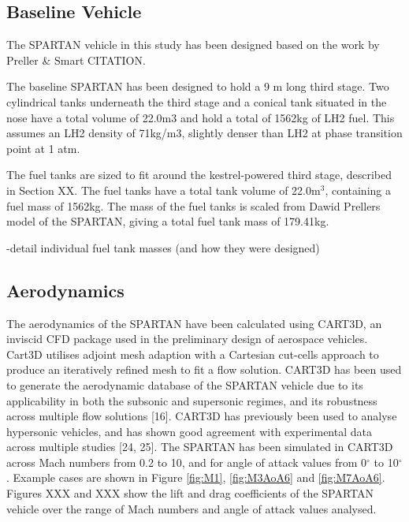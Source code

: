 		\subsection{Baseline Vehicle}
		The SPARTAN vehicle in this study has been designed based on the work by Preller \& Smart CITATION. 
		
		The baseline SPARTAN has been designed to hold a 9 m long third stage.  Two cylindrical tanks underneath the third stage and a conical tank situated in the nose have a total volume of 22.0m3 and hold a total of 1562kg of LH2 fuel. This assumes an LH2 density of 71kg/m3, slightly denser than LH2 at phase transition point at 1 atm.
		
		
		
		The fuel tanks are sized to fit around the kestrel-powered third stage, described in Section XX. 
The fuel tanks have a total tank volume of 22.0m$^3$, containing a fuel mass of 1562kg.
The mass of the fuel tanks is scaled from Dawid Prellers model of the SPARTAN, giving a total fuel tank mass of 179.41kg.
		
		-detail individual fuel tank masses (and how they were designed)

		
		
		\subsection{Aerodynamics}
		
		The aerodynamics of the SPARTAN have been calculated using CART3D, an inviscid CFD package used in the preliminary design of aerospace vehicles. Cart3D utilises adjoint mesh adaption with a Cartesian cut-cells approach to produce an iteratively refined mesh to fit a flow solution. CART3D has
		been used to generate the aerodynamic database of the SPARTAN vehicle due to its applicability in both the subsonic
		and supersonic regimes, and its robustness across multiple flow solutions [16]. CART3D has previously been used to
		analyse hypersonic vehicles, and has shown good agreement with experimental data across multiple studies [24, 25].
		The SPARTAN has been simulated in CART3D across Mach numbers from 0.2 to 10, and for angle of attack values from
		0$^\circ$ to 10$^\circ$. Example cases are shown in Figure \ref{fig:M1}, \ref{fig:M3AoA6} and \ref{fig:M7AoA6}. Figures XXX and XXX show the lift and drag
		coefficients of the SPARTAN vehicle over the range of Mach numbers and angle of attack values analysed.
		
